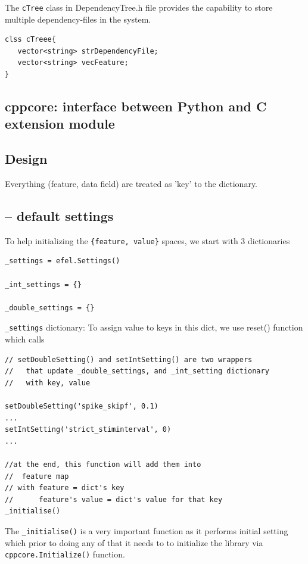 The \verb!cTree! class in DependencyTree.h file provides the capability to store
multiple dependency-files in the system.

\begin{lstlisting}
clss cTreee{
   vector<string> strDependencyFile;
   vector<string> vecFeature;
}
\end{lstlisting}


\subsection{cppcore: interface between Python and C extension module}



\subsection{Design}

Everything (feature, data field) are treated as 'key' to the dictionary.

\subsection{-- default settings}
\label{sec:efel-minimal-settings}

To help initializing the \verb!{feature, value}! spaces, we start with
3 dictionaries

\begin{lstlisting}
_settings = efel.Settings()

_int_settings = {}

_double_settings = {}
\end{lstlisting}

\verb!_settings! dictionary: To assign value to keys in this dict, we use
reset() function which calls
\begin{lstlisting}
// setDoubleSetting() and setIntSetting() are two wrappers
//   that update _double_settings, and _int_setting dictionary
//   with key, value

setDoubleSetting('spike_skipf', 0.1)
...
setIntSetting('strict_stiminterval', 0)
...

//at the end, this function will add them into 
//  feature map
// with feature = dict's key
//      feature's value = dict's value for that key
_initialise()
\end{lstlisting}

The \verb!_initialise()! is a very important function as it performs initial
setting which prior to doing any of that it needs to to initialize the library
via \verb!cppcore.Initialize()! function.



